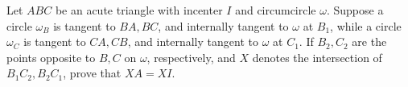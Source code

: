 Let $ABC$ be an acute triangle with incenter $I$ and circumcircle $\omega$. Suppose a circle $\omega_B$ is tangent to $BA,BC$, and internally tangent to $\omega$ at $B_1$, while a circle $\omega_C$ is tangent to $CA, CB$, and internally tangent to $\omega$ at $C_1$. If $B_2, C_2$ are the points opposite to $B,C$ on $\omega$, respectively, and $X$ denotes the intersection of $B_1C_2, B_2C_1$, prove that $XA=XI$.

